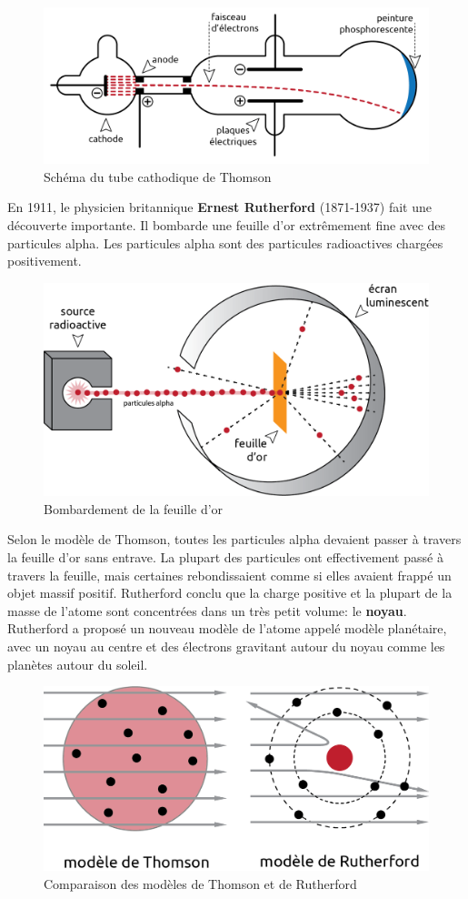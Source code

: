 \documentclass[
  11pt,
  french,
  a4paper,
  openany]{book}
\begin{document}
\begin{figure}

{\centering \includegraphics[width=0.4\linewidth]{images/exp-thomson} 

}

\caption{Schéma du tube cathodique de Thomson}\label{fig:exp-thomson}
\end{figure}

En 1911, le physicien britannique \textbf{Ernest Rutherford} (1871-1937) fait une découverte importante. Il bombarde une feuille d'or extrêmement fine avec des particules alpha. Les particules alpha sont des particules radioactives chargées positivement.

\begin{figure}

{\centering \includegraphics[width=0.4\linewidth]{images/exp-rutherford} 

}

\caption{Bombardement de la feuille d'or}\label{fig:exp-rutherford}
\end{figure}

Selon le modèle de Thomson, toutes les particules alpha devaient passer à travers la feuille d'or sans entrave. La plupart des particules ont effectivement passé à travers la feuille, mais certaines rebondissaient comme si elles avaient frappé un objet massif positif. Rutherford conclu que la charge positive et la plupart de la masse de l'atome sont concentrées dans un très petit volume: le \textbf{noyau}. Rutherford a proposé un nouveau modèle de l'atome appelé modèle planétaire, avec un noyau au centre et des électrons gravitant autour du noyau comme les planètes autour du soleil.

\begin{figure}

{\centering \includegraphics[width=0.4\linewidth]{images/exp-thomson-rutherford} 

}

\caption{Comparaison des modèles de Thomson et de Rutherford}\label{fig:exp-thomson-rutherford}
\end{figure}
\end{document}
